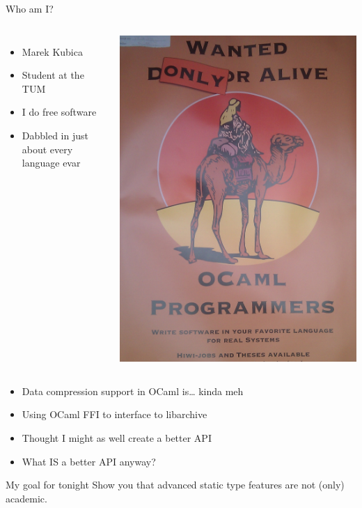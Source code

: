 \documentclass{beamer}
\begin{document}
\begin{frame}{Who am I?}
  \begin{columns}
      \begin{itemize}
        \item Marek Kubica
        \item Student at the TUM
        \item I do free software
        \item Dabbled in just about every language evar
      \end{itemize}
      \includegraphics[height=0.9\textheight]{poster}
  \end{columns}
\end{frame}

\begin{frame}
  \begin{itemize}
    \item Data compression support in OCaml is… kinda meh
    \item Using OCaml FFI to interface to libarchive
    \item Thought I might as well create a better API
    \item What IS a better API anyway?
  \end{itemize}
  \pause
  \begin{exampleblock}{My goal for tonight}
    Show you that advanced static type features are not (only) academic.
  \end{exampleblock}
\end{frame}
\end{document}
